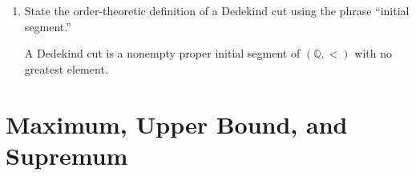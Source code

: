 \documentclass{essay}
\begin{document}
\begin{enumerate}[label=\arabic*., itemsep=10pt]
\begin{answer}
Yes, but then the axioms would need to be changed, for example by requiring $B$ to have no least element instead. It is a different endpoint convention.
\end{answer}

\item State the order-theoretic definition of a Dedekind cut using the phrase ``initial segment.''

\begin{answer}
A Dedekind cut is a nonempty proper initial segment of $(\mathbb{Q},<)$ with no greatest element.
\end{answer}

\end{enumerate}

\section{Maximum, Upper Bound, and Supremum}
\end{document}
